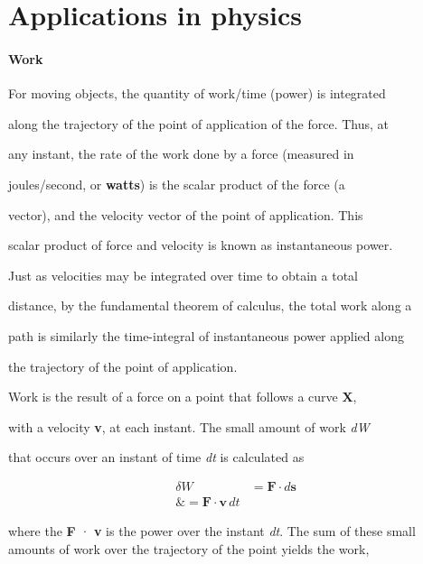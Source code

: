 \section{Applications in physics}
\label{sec:applications-in-physics}

\paragraph{Work}



For moving objects, the quantity of work/time (power) is integrated

along the trajectory of the point of application of the force. Thus, at

any instant, the rate of the work done by a force (measured in

joules/second, or \textbf{watts}) is the scalar product of the force (a

vector), and the velocity vector of the point of application. This

scalar product of force and velocity is known as instantaneous power.

Just as velocities may be integrated over time to obtain a total

distance, by the fundamental theorem of calculus, the total work along a

path is similarly the time-integral of instantaneous power applied along

the trajectory of the point of application.



Work is the result of a force on a point that follows a curve \textbf{X},

with a velocity \textbf{v}, at each instant. The small amount of work \textit{dW}

that occurs over an instant of time \textit{dt} is calculated as



\begin{align}
\delta W &= \mathbf{F}\cdot d\mathbf{s} \\\&= \mathbf{F}\cdot\mathbf{v}\,dt
\end{align}



where the \textbf{F} · \textbf{v} is the power over the instant \textit{dt}. The sum of these small amounts of work over the trajectory of the point yields the work,



